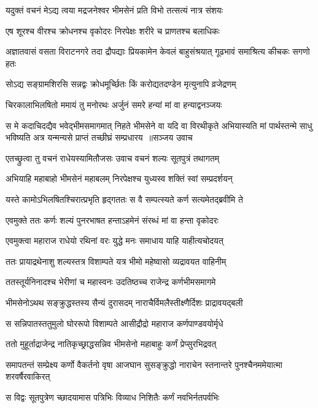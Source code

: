 \twolineshloka
{यदुक्तं वचनं मेऽद्य त्वया मद्रजनेश्वर}
{भीमसेनं प्रति विभो तत्सत्यं नात्र संशयः}


\twolineshloka
{एष शूरश्च वीरश्च क्रोधनश्च वृकोदरः}
{निरपेक्षः शरीरे च प्राणतश्च बलाधिकः}


\threelineshloka
{अज्ञातवासं वसता विराटनगरे तदा}
{द्रौपद्याः प्रियकामेन केवलं बाहुसंश्रयात्}
{गूढभावं समाश्रित्य कीचकः सगणो हतः}


\twolineshloka
{सोऽद्य सङ्ग्रामशिरसि सन्नद्वः क्रोधमूर्च्छितः}
{किं करोद्यतदण्डेन मृत्युनापि व्रजेद्रणम्}


\twolineshloka
{चिरकालाभिलषितो ममायं तु मनोरथः}
{अर्जुनं समरे हन्यां मां वा हन्याद्वनञ्जयः}


स मे कदाचिदद्यैव भवेद्भीमसमागमात्
\fourlineindentedshloka
{निहते भीमसेने वा यदि वा विरथीकृते}
{अभियास्यति मां पार्थस्तन्मे साधु भविष्यति}
{अत्र यन्मन्यसे प्राप्तं तच्छीघ्रं सम्प्रधारय ॥सञ्जय उवाच}
{}


\twolineshloka
{एतच्छ्रुत्वा तु वचनं राधेयस्यामितौजसः}
{उवाच वचनं शल्यः सूतपुत्रं तथागतम्}


\twolineshloka
{अभियाहि महाबाहो भीमसेनं महाबलम्}
{निरपेक्षश्च युध्यस्व शक्तिं स्वां सम्प्रदर्शयन्}


\twolineshloka
{यस्ते कामोऽभिलषितश्चिरात्प्रभृति हृद्गततः}
{स वै सम्पत्स्यते कर्ण सत्यमेतद्ब्रवीमि ते}


\twolineshloka
{एवमुक्ते ततः कर्णः शल्यं पुनरभाषत}
{हन्ताऽहमेनं संरब्धं मां वा हन्ता वृकोदरः}


\twolineshloka
{एवमुक्त्वा महाराज राधेयो रथिनां वरः}
{युद्धे मनः समाधाय याहि याहीत्यचोदयत्}


\twolineshloka
{ततः प्रायाद्रथेनाशु शल्यस्तत्र विशाम्पते}
{यत्र भीमो महेष्वासो व्यद्रावयत वाहिनीम्}


\twolineshloka
{ततस्तूर्यनिनादश्च भेरीणां च महास्वनः}
{उदतिष्ठच्च राजेन्द्र कर्णभीमसमागमे}


\twolineshloka
{भीमसेनोऽथथ सङ्क्रुद्धस्तस्य सैन्यं दुरासदम्}
{नाराचैर्विमलैस्तीक्ष्णैर्दिशः प्राद्रावयद्बली}


\twolineshloka
{स सन्निपातस्ततुमुलो घोररूपो विशाम्पते}
{आसीद्रौद्रो महाराज कर्णपाण्डवयोर्मृधे}


\twolineshloka
{ततो मुहूर्ताद्राजेन्द्र नातिकृच्छ्राद्धसन्निव}
{भीमसेनो महाबाहुः कर्णं प्रेप्सुरभिद्रवत्}


\threelineshloka
{समापतन्तं सम्प्रेक्ष्य कर्णो वैकर्तनो वृषा}
{आजघान सुसङ्क्रुद्धो नाराचेन स्तनान्तरे}
{पुनश्चैनममेयात्मा शरवर्षैरवाकिरत्}


\twolineshloka
{स विद्वः सूतपुत्रेण च्छादयामास पत्रिभिः}
{विव्याध निशितैः कर्णं नवभिर्नतपर्वभिः}


